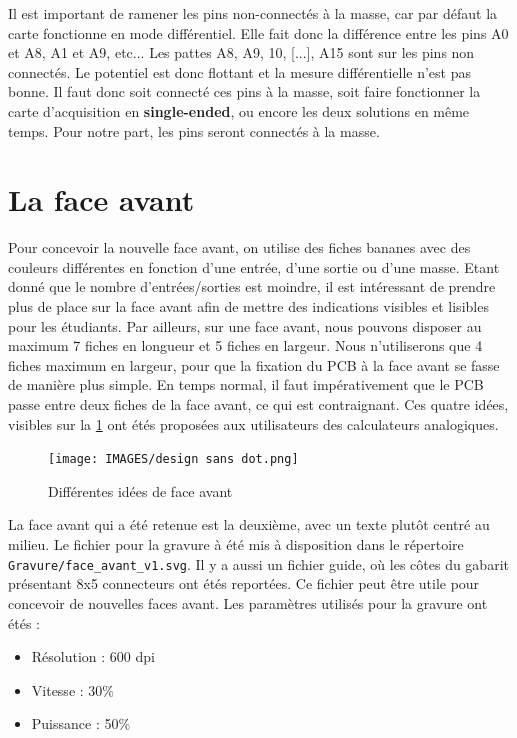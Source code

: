 \documentclass{report}
\begin{document}
Il est important de ramener les pins non-connectés à la masse, car par défaut la carte fonctionne en mode différentiel. Elle fait donc la différence entre les pins A0 et A8, A1 et A9, etc... Les pattes A8, A9, 10, [...], A15 sont sur les pins non connectés. Le potentiel est donc flottant et la mesure différentielle n'est pas bonne. Il faut donc soit connecté ces pins à la masse, soit faire fonctionner la carte d'acquisition en \textbf{single-ended}, ou encore les deux solutions en même temps. Pour notre part, les pins seront connectés à la masse.

\section{La face avant}
Pour concevoir la nouvelle face avant, on utilise des fiches bananes avec des couleurs différentes en fonction d'une entrée, d'une sortie ou d'une masse. Etant donné que le nombre d'entrées/sorties est moindre, il est intéressant de prendre plus de place sur la face avant afin de mettre des indications visibles et lisibles pour les étudiants. Par ailleurs, sur une face avant, nous pouvons disposer au maximum 7 fiches en longueur et 5 fiches en largeur. Nous n'utiliserons que 4 fiches maximum en largeur, pour que la fixation du PCB à la face avant se fasse de manière plus simple. En temps normal, il faut impérativement que le PCB passe entre deux fiches de la face avant, ce qui est contraignant. Ces quatre idées, visibles sur la  \ref{fig:design_face_avant} ont étés proposées aux utilisateurs des calculateurs analogiques.

\begin{figure}[!h]
\begin{center}
\texttt{[image: IMAGES/design sans dot.png]} 
\caption{Différentes idées de face avant}
\label{fig:design_face_avant}
\end{center}
\end{figure}

La face avant qui a été retenue est la deuxième, avec un texte plutôt centré au milieu. Le fichier pour la gravure à été mis à disposition dans le répertoire \verb+ Gravure/face_avant_v1.svg+. Il y a aussi un fichier guide, où les côtes du gabarit présentant 8x5 connecteurs ont étés reportées. Ce fichier peut être utile pour concevoir de nouvelles faces avant. Les paramètres utilisés pour la gravure ont étés :
\begin{itemize}
\item Résolution : 600 dpi
\item Vitesse : 30$\%$
\item Puissance : 50$\%$
\end{itemize}
\end{document}

